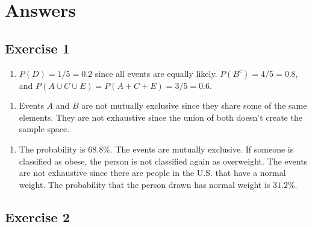 \documentclass[
  letterpaper,
  DIV=11,
  numbers=noendperiod]{scrreprt}
\providecommand{\tightlist}{%
  \setlength{\itemsep}{0pt}\setlength{\parskip}{0pt}}\usepackage{longtable,booktabs,array}
\begin{document}
\hypertarget{answers-7}{%
\section{Answers}\label{answers-7}}

\hypertarget{exercise-1-15}{%
\subsection*{Exercise 1}\label{exercise-1-15}}

\begin{blackbox}

\begin{enumerate}
\def\labelenumi{\arabic{enumi}.}
\tightlist
\item
  \(P(D)=1/5=0.2\) since all events are equally likely.
  \(P(B^c)=4/5=0.8\), and \(P(A \cup C \cup E)=P(A + C + E)=3/5=0.6\).
\end{enumerate}

\end{blackbox}

\begin{blackbox}

\begin{enumerate}
\def\labelenumi{\arabic{enumi}.}
\setcounter{enumi}{1}
\tightlist
\item
  Events \(A\) and \(B\) are not mutually exclusive since they share
  some of the same elements. They are not exhaustive since the union of
  both doesn't create the sample space.
\end{enumerate}

\end{blackbox}

\begin{blackbox}

\begin{enumerate}
\def\labelenumi{\arabic{enumi}.}
\setcounter{enumi}{2}
\tightlist
\item
  The probability is \(68.8\)\%. The events are mutually exclusive. If
  someone is classified as obese, the person is not classified again as
  overweight. The events are not exhaustive since there are people in
  the U.S. that have a normal weight. The probability that the person
  drawn has normal weight is \(31.2\)\%.
\end{enumerate}

\end{blackbox}

\hypertarget{exercise-2-15}{%
\subsection*{Exercise 2}\label{exercise-2-15}}
\end{document}
